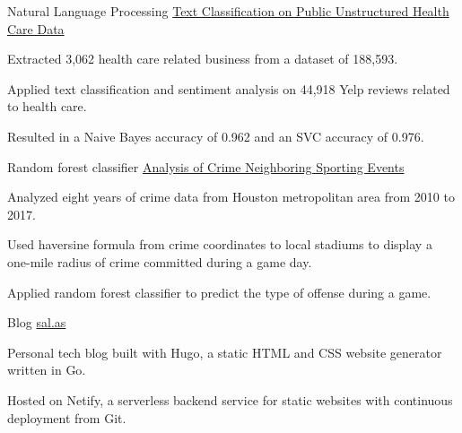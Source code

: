

\begin{cventries}
	
	\cventrynodate
	{Natural Language Processing} %
	{\href{https://github.com/franksalas/text_classification_public_healthcare_data}{Text Classification on Public Unstructured Health Care Data}}
	{} %
	{}
	{
		\begin{cvitems} %
			\item {Extracted 3,062 health care related business from a dataset of 188,593.}
			\item {Applied text classification and sentiment analysis on  44,918 Yelp reviews related to health care.}
			\item {Resulted in a Naive Bayes accuracy of 0.962 and an SVC accuracy of 0.976.}
		\end{cvitems}
	}
	
	
	
	\cventrynodate
	{Random forest classifier} %
	{\href{https://github.com/franksalas/Crime-Analysis}{Analysis of Crime Neighboring Sporting Events}} %
	{} %
	{} %
	{
		\begin{cvitems} %
			\item {Analyzed eight years of crime data from Houston metropolitan area from 2010 to 2017.}
			\item {Used haversine formula from crime coordinates to local stadiums to display a one-mile radius of crime committed during a game day.}
			\item {Applied random forest classifier to predict the type of offense during a game.}
		\end{cvitems}
	}
	
	\cventrynodate
	{Blog} %
	{\href{https://github.com/franksalas/blog}{sal.as}} %
	{} %
	{} %
	{
		\begin{cvitems} %
			\item {Personal tech blog built with Hugo, a static HTML and CSS website generator written in Go.}
			\item {Hosted on Netify, a serverless backend service for static websites with continuous deployment from Git.}
		\end{cvitems}
	}
	\vspace*{-6mm}
\end{cventries}
